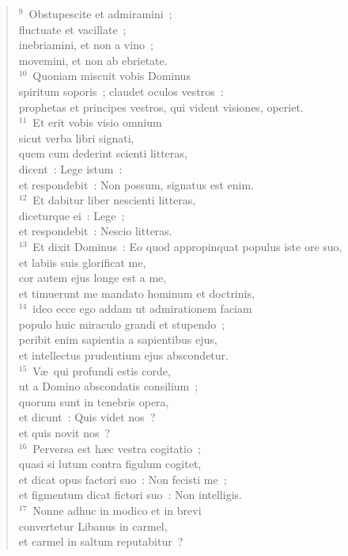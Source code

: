 \begin{verse}
${}^{9}$~Obstupescite et admiramini~;\\ fluctuate et vacillate~;\\ inebriamini, et non a vino~;\\ movemini, et non ab ebrietate.\\
${}^{10}$~Quoniam miscuit vobis Dominus\\ spiritum soporis~; claudet oculos vestros~:\\ prophetas et principes vestros, qui vident visiones, operiet.\\
${}^{11}$~Et erit vobis visio omnium\\ sicut verba libri signati,\\ quem cum dederint scienti litteras,\\ dicent~: Lege istum~:\\ et respondebit~: Non possum, signatus est enim.\\
${}^{12}$~Et dabitur liber nescienti litteras,\\ diceturque ei~: Lege~;\\ et respondebit~: Nescio litteras.\\
${}^{13}$~Et dixit Dominus~: Eo quod appropinquat populus iste ore suo,\\ et labiis suis glorificat me,\\ cor autem ejus longe est a me,\\ et timuerunt me mandato hominum et doctrinis,\\
${}^{14}$~ideo ecce ego addam ut admirationem faciam\\ populo huic miraculo grandi et stupendo~;\\ peribit enim sapientia a sapientibus ejus,\\ et intellectus prudentium ejus abscondetur.\\
${}^{15}$~V\ae\ qui profundi estis corde,\\ ut a Domino abscondatis consilium~;\\ quorum sunt in tenebris opera,\\ et dicunt~: Quis videt nos~?\\ et quis novit nos~?\\
${}^{16}$~Perversa est h\ae c vestra cogitatio~;\\ quasi si lutum contra figulum cogitet,\\ et dicat opus factori suo~: Non fecisti me~;\\ et figmentum dicat fictori suo~: Non intelligis.\\
${}^{17}$~Nonne adhuc in modico et in brevi\\ convertetur Libanus in carmel,\\ et carmel in saltum reputabitur~?\\

\end{verse}
